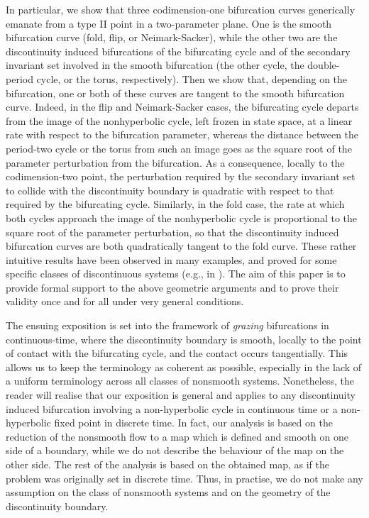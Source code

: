 \documentclass[final,onefignum]{siamltex}
\begin{document}
In particular, we show that three codimension-one bifurcation curves generically emanate from a type II point in a two-parameter plane.  One is the smooth bifurcation curve (fold, flip, or Neimark-Sacker), while the other two are the discontinuity induced bifurcations of the bifurcating cycle and of the secondary invariant set involved in the smooth bifurcation (the other cycle, the double-period cycle, or the torus, respectively).  Then we show that, depending on the bifurcation, one or both of these curves are tangent to the smooth bifurcation curve.  Indeed, in the flip and Neimark-Sacker cases, the bifurcating cycle departs from the image of the nonhyperbolic cycle, left frozen in state space, at a linear rate with respect to the bifurcation parameter, whereas the distance between the period-two cycle or the torus from such an image goes as the square root of the parameter perturbation from the bifurcation.  As a consequence, locally to the codimension-two point, the perturbation required by the secondary invariant set to collide with the discontinuity boundary is quadratic with respect to that required by the bifurcating cycle.  Similarly, in the fold case, the rate at which both cycles approach the image of the nonhyperbolic cycle is proportional to the square root of the parameter perturbation, so that the discontinuity induced bifurcation curves are both quadratically tangent to the fold curve.  These rather intuitive results have been observed in many examples, and proved for some specific classes of discontinuous systems (e.g., in \citep{Dankowicz05, Kowalczyk06, Nordmark06, Thota06, Zhao06, Simpson08b, Simpson09a}).  The aim of this paper is to provide formal support to the above geometric arguments and to prove their validity once and for all under very general conditions.

The ensuing exposition is set into the framework of
{\it grazing} bifurcations in continuous-time, where the discontinuity boundary
is smooth, locally to the point of contact with the bifurcating cycle, and
the contact occurs tangentially.
This allows us to keep the terminology as coherent as possible, especially
in the lack of a uniform terminology across all classes of nonsmooth systems.
Nonetheless, the reader will realise that our exposition is general and applies
to any discontinuity induced bifurcation involving a non-hyperbolic cycle in
continuous time or a non-hyperbolic fixed point in discrete time.
In fact, our analysis is based on the reduction of the nonsmooth flow to a
map which is defined and smooth on one side of a boundary, while we do not
describe the behaviour of the map on the other side. The rest of the analysis
is based on the obtained map, as if the problem was originally set in 
discrete time.
Thus, in practise, we do not make any assumption on the class of nonsmooth
systems and on the geometry of the discontinuity boundary.
\end{document}

